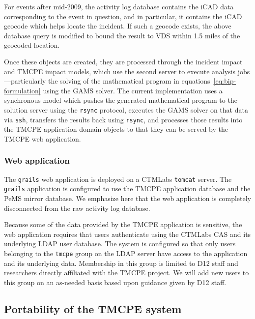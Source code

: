 \documentclass[12pt]{report}
\begin{document}
For events after mid-2009, the activity log database contains the \ac{iCAD} data
corresponding to the event in question, and in particular, it contains the
\ac{iCAD} geocode which helps locate the incident.  If such a geocode exists,
the above database query is modified to bound the result to \ac{VDS} within 1.5
miles of the geocoded location.

Once these objects are created, they are processed through the incident impact
and \ac{TMCPE} impact models, which use the second server to execute analysis
jobs---particularly the solving of the mathematical program in
equations~\eqref{eq:bip-formulation} using the \ac{GAMS} solver.  The current
implementation uses a synchronous model which pushes the generated mathematical
program to the solution server using the \texttt{rsync} protocol, executes the
\ac{GAMS} solver on that data via \texttt{ssh}, transfers the results back using
\texttt{rsync}, and processes those results into the \ac{TMCPE} application
domain objects to that they can be served by the \ac{TMCPE} web application.


\subsubsection{Web application}
\label{sec:web-app}

The \texttt{grails} web application is deployed on a \ac{CTMLabs}
\texttt{tomcat} server.  The \texttt{grails} application is configured to use
the \ac{TMCPE} application database and the \ac{PeMS} mirror database.  We
emphasize here that the web application is completely disconnected from the raw
activity log database.  

Because some of the data provided by the \ac{TMCPE} application is sensitive,
the web application requires that users authenticate using the \ac{CTMLabs}
\acf{CAS} and its underlying \ac{LDAP} user database.  The system is configured
so that only users belonging to the \texttt{tmcpe} group on the \ac{LDAP} server
have access to the application and its underlying data.  Membership in this
group is limited to \ac{D12} staff and researchers directly affiliated with the
\ac{TMCPE} project.  We will add new users to this group on an as-needed basis
based upon guidance given by \ac{D12} staff.


\subsection{Portability of the TMCPE system}
\label{sec:portability}
\end{document}
